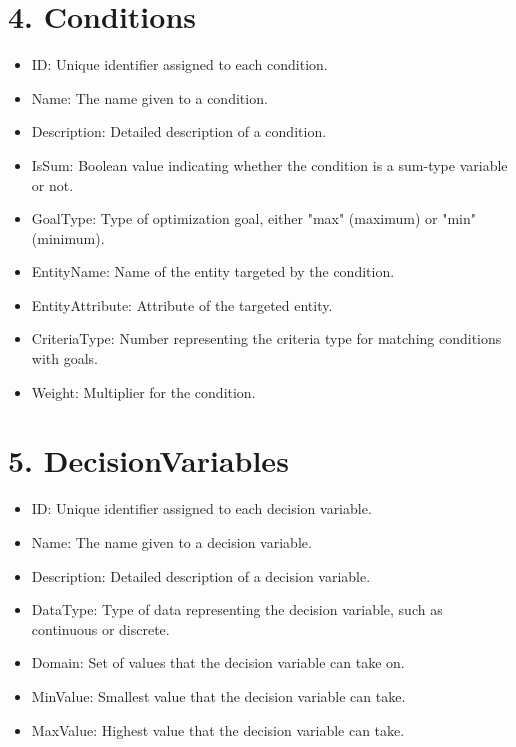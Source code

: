 \documentclass{article}
\begin{document}
\section*{4. Conditions}
\begin{itemize}
    \item ID: Unique identifier assigned to each condition.
    \item Name: The name given to a condition.
    \item Description: Detailed description of a condition.
    \item IsSum: Boolean value indicating whether the condition is a sum-type variable or not.
    \item GoalType: Type of optimization goal, either "max" (maximum) or "min" (minimum).
    \item EntityName: Name of the entity targeted by the condition.
    \item EntityAttribute: Attribute of the targeted entity.
    \item CriteriaType: Number representing the criteria type for matching conditions with goals.
    \item Weight: Multiplier for the condition.
\end{itemize}

\section*{5. DecisionVariables}
\begin{itemize}
    \item ID: Unique identifier assigned to each decision variable.
    \item Name: The name given to a decision variable.
    \item Description: Detailed description of a decision variable.
    \item DataType: Type of data representing the decision variable, such as continuous or discrete.
    \item Domain: Set of values that the decision variable can take on.
    \item MinValue: Smallest value that the decision variable can take.
    \item MaxValue: Highest value that the decision variable can take.
\end{itemize}
\end{document}
